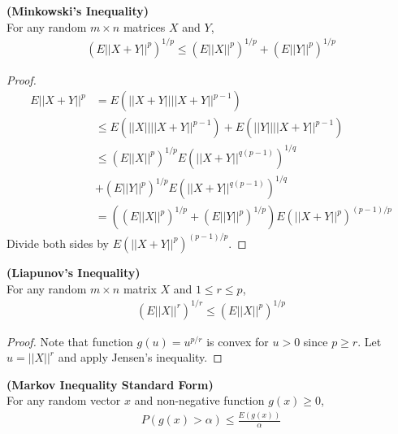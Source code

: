 \documentclass[11pt]{article} %
\theoremstyle{definition}
\numberwithin{defn}{subsection}
\numberwithin{thm}{subsection}
\numberwithin{ex}{subsection}
\begin{document}
\begin{thm}\label{thm:minkowski'sineq}
	\textbf{(Minkowski's Inequality)}\\
	For any random $m\times n$ matrices $X$ and $Y$,
	\begin{align*}
	(E||X+Y||^p)^{1/p}\le(E||X||^p)^{1/p}+(E||Y||^p)^{1/p}
	\end{align*}	
	\begin{proof}
		\begin{align*}
		E||X+Y||^p&=E(||X+Y||||X+Y||^{p-1})\\
		&\le E(||X||||X+Y||^{p-1})+E(||Y||||X+Y||^{p-1})\\
		&\le (E||X||^p)^{1/p}E(||X+Y||^{q(p-1)})^{1/q}\\
		&+(E||Y||^p)^{1/p}E(||X+Y||^{q(p-1)})^{1/q}\\
		&=((E||X||^p)^{1/p}+(E||Y||^p)^{1/p})E(||X+Y||^p)^{(p-1)/p}
		\end{align*}
		Divide both sides by $E(||X+Y||^p)^{(p-1)/p}.$
	\end{proof}
\end{thm}

\begin{thm}\label{thm:liapunovsineq}
	\textbf{(Liapunov's Inequality)}\\
	For any random $m \times n$ matrix $X$ and $1\le r\le p$,
	\begin{align*}
	(E||X||^r)^{1/r}\le (E||X||^p)^{1/p}
	\end{align*}	
	\begin{proof}
		Note that function $g(u)=u^{p/r}$ is convex for $u>0$ since $p\ge r$. Let $u=||X||^r$ and apply Jensen's inequality.
	\end{proof}
\end{thm}

\begin{thm}\label{thm:markoveineq}
	\textbf{(Markov Inequality Standard Form)}\\
	For any random vector $x$ and non-negative function $g(x)\ge 0$,
	\begin{align*}
	P(g(x)>\alpha)\le\frac{E(g(x))}{\alpha}
	\end{align*}
\end{thm}
\end{document}
